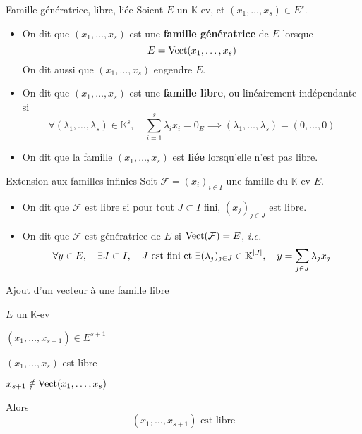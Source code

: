     \begin{defi}{Famille génératrice, libre, liée}{}
        Soient $E$ un $\mathbb{K}$-ev, et $(x_1,\ldots,x_s) \in E^s$.

        \begin{itemize}
            \item On dit que $(x_1,\ldots,x_s)$ est une \textbf{famille génératrice} de $E$ lorsque 
        \[ E = \operatorname{Vect}(x_1,\ldots,x_s) \] 
        On dit aussi que $(x_1,\ldots,x_s)$ engendre $E$.
            \item On dit que $(x_1,\ldots,x_s)$ est une \textbf{famille libre}, ou linéairement indépendante si 
            \[ \forall (\lambda_1,\ldots,\lambda_s) \in \mathbb{K}^s, \quad \sum\limits_{i=1}^s \lambda_i x_i = 0_E \implies (\lambda_1,\ldots,\lambda_s) = (0,\ldots,0) \]
            \item On dit que la famille $(x_1,\ldots,x_s)$ est \textbf{liée} lorsqu’elle n’est pas libre.
        \end{itemize}
    \end{defi}

    \begin{defi}{Extension aux familles infinies}{}
        Soit $\mathcal{F} = (x_i)_{i \in I}$ une famille du $\mathbb{K}$-ev $E$.
        \begin{itemize}
            \item On dit que $\mathcal{F}$ est libre si pour tout $J \subset I$ fini, $(x_j)_{j \in J}$ est libre.
            \item On dit que $\mathcal{F}$ est génératrice de $E$ si $\operatorname{Vect}(\mathcal{F}) = E$, \textit{i.e.}
            \[ \forall y \in E, \quad \exists J \subset I, \quad J \text{ est fini et } \exists (\lambda_j)_{j \in J} \in \mathbb{K}^{\left\lvert J\right\rvert}, \quad y = \sum_{j \in J} \lambda_j x_j \]
        \end{itemize}
    \end{defi}

    \begin{prop}{Ajout d’un vecteur à une famille libre}{}
        \begin{soient}
            \item $E$ un $\mathbb{K}$-ev
            \item $(x_1,\ldots,x_{s+1}) \in E^{s+1}$
        \end{soient}
        \begin{suppose}
            \item $(x_1,\ldots,x_s)$ est libre
            \item $x_{s+1} \notin \operatorname{Vect}(x_1,\ldots,x_{s})$
        \end{suppose}
        Alors \[ (x_1,\ldots,x_{s+1}) \text{ est libre} \]
    \end{prop}

